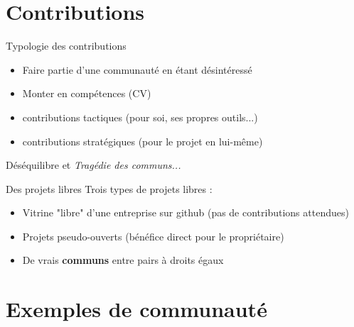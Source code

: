 \documentclass{beamer}
\begin{document}
\section{Contributions}

\begin{frame}{Typologie des contributions}

  \begin{itemize}
  \item Faire partie d'une communauté en étant désintéressé
  \item Monter en compétences (CV)
  \item contributions tactiques (pour soi, ses propres outils...)
  \item contributions stratégiques (pour le projet en lui-même)
  \end{itemize}

  Déséquilibre et \textit{Tragédie des communs...}

  
\end{frame}

\begin{frame}{Des projets libres}
  Trois types de projets libres :
  \begin{itemize}
  \item Vitrine "libre" d'une entreprise sur github (pas de contributions attendues)
  \item Projets pseudo-ouverts (bénéfice direct pour le propriétaire)
  \item De vrais \textbf{communs} entre pairs à droits égaux
  \end{itemize}
\end{frame}

\section{Exemples de communauté}
\end{document}
